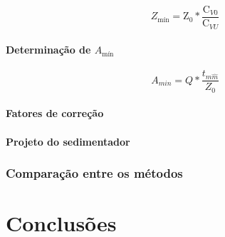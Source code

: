 \begin{equation}\label{key}
Z_{\text{mín}} =\mathrm{Z}_{0} * \frac{\mathrm{C}_{V 0}}{\mathrm{C}_{V U}}
\end{equation}


\subsubsection{Determinação de $ A_{\text{mín}} $}

\begin{equation}\label{key}
A_{m i n}=Q * \frac{t_{m \hat{m}}}{Z_{0}}
\end{equation}

\subsubsection{Fatores de correção}

\subsubsection{Projeto do sedimentador}

\subsection{Comparação entre os métodos}

\chapter{Conclusões}
